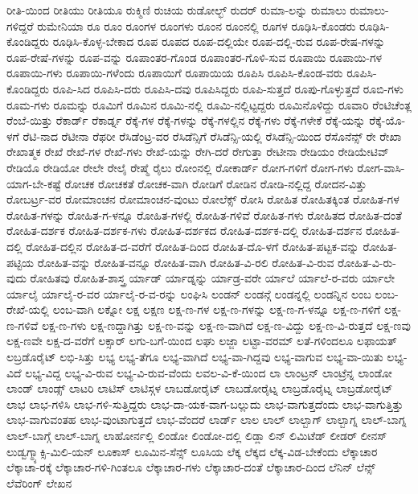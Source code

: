 {ರೀತಿ-ಯಿಂದ
ರೀತಿಯು
ರೀತಿಯೂ
ರುಕ್ಮಿಣಿ
ರುಚಿಯ
ರುಡೋಲ್ಭ್
ರುದರ್
ರುಮಾ-ಲನ್ನು
ರುಮಾಲು
ರುಮಾಲು-ಗಳಿದ್ದರೆ
ರುಮೇನಿಯಾ
ರೂ
ರೂಂ
ರೂಂಗಳ
ರೂಂಗಳು
ರೂಂನ
ರೂಂನಲ್ಲಿ
ರೂಗಳ
ರೂಢಿಸಿ-ಕೊಂಡರು
ರೂಢಿಸಿ-ಕೊಂಡಿದ್ದರು
ರೂಢಿಸಿ-ಕೊಳ್ಳ-ಬೇಕಾದ
ರೂಪ
ರೂಪದ
ರೂಪ-ದಲ್ಲಿಯೇ
ರೂಪ-ದಲ್ಲಿ-ರುವ
ರೂಪ-ರೇಷ-ಗಳನ್ನು
ರೂಪ-ರೇಷೆ-ಗಳನ್ನು
ರೂಪ-ವನ್ನು
ರೂಪಾಂತರ-ಗೊಂಡ
ರೂಪಾಂತರ-ಗೊಳಿ-ಸುವ
ರೂಪಾಯಿ
ರೂಪಾಯಿ-ಗಳ
ರೂಪಾಯಿ-ಗಳು
ರೂಪಾಯಿ-ಗಳೆಂದು
ರೂಪಾಯಿಗೆ
ರೂಪಾಯಿಯ
ರೂಪಿಸಿ
ರೂಪಿಸಿ-ಕೊಂಡ-ವರು
ರೂಪಿಸಿ-ಕೊಂಡಿದ್ದರು
ರೂಪಿ-ಸಿದ
ರೂಪಿಸಿ-ದರು
ರೂಪಿಸಿ-ದವು
ರೂಪಿಸಿದ್ದರು
ರೂಪಿ-ಸುತ್ತದೆ
ರೂಪು-ಗೊಳ್ಳುತ್ತದೆ
ರೂಬಿ-ಗಳು
ರೂಮ-ಗಳು
ರೂಮನ್ನು
ರೂಮಿಗೆ
ರೂಮಿನ
ರೂಮಿ-ನಲ್ಲಿ
ರೂಮಿ-ನಲ್ಲಿಟ್ಟದ್ದರು
ರೂಮಿನೊಳಿದ್ದು
ರೂವಾರಿ
ರೆಂಟಿಚೆಂತ್ಲ
ರೆಂಬೆ-ಯಿತ್ತು
ರೆಕಾರ್ಡ್
ರೆಕಾರ್ಡ್ನ
ರೆಕ್ಕೆ-ಗಳ
ರೆಕ್ಕೆ-ಗಳನ್ನು
ರೆಕ್ಕೆ-ಗಳಲ್ಲಿನ
ರೆಕ್ಕೆ-ಗಳು
ರೆಕ್ಕೆ-ಗಳೇಕೆ
ರೆಕ್ಕೆ-ಯನ್ನು
ರೆಕ್ಕೆ-ಯೊ-ಳಗೆ
ರೆಟಿ-ನಾದ
ರೆಟೀನಾ
ರೆಫರೀ
ರೆಸಿಡೆಂಟ್ರ-ವರ
ರೆಸಿಡೆನ್ಸಿಗೆ
ರೆಸಿಡೆನ್ಸಿ-ಯಲ್ಲಿ
ರೆಸಿಡೆನ್ಸಿ-ಯಿಂದ
ರೆಸೊನೆನ್ಸ್
ರೇ
ರೇಖಾ
ರೇಖಾತ್ಮಕ
ರೇಖೆ
ರೇಖೆ-ಗಳ
ರೇಖೆ-ಗಳು
ರೇಖೆ-ಯನ್ನು
ರೇಗಿ-ದರೆ
ರೇಗುತ್ತಾ
ರೇಟೀನಾ
ರೇಡಿಯಂ
ರೇಡಿಯೇಟಿವ್
ರೇಡಿಯೊ
ರೇಡಿಯೋ
ರೇಲೇ
ರೇಲೈ
ರೇಷ್ಮೆ
ರೈಲು
ರೋಂನಲ್ಲಿ
ರೋಕಾರ್ಡ್
ರೋಗ-ಗಳಿಗೆ
ರೋಗ-ಗಳು
ರೋಗ-ವಾಸಿ-ಯಾಗ-ಬೇ-ಕಷ್ಟೆ
ರೋಚಕ
ರೋಚಕತೆ
ರೋಚಕ-ವಾಗಿ
ರೋಡಿಗೆ
ರೋಡಿನ
ರೋಡಿ-ನಲ್ಲಿದ್ದ
ರೋದನ-ವಿತ್ತು
ರೋಬರ್ಟ್ರ-ವರ
ರೋಮಾಂಚನ
ರೋಮಾಂಚನ-ವುಂಟು
ರೋಲೆಕ್ಸ್
ರೋಸಿ
ರೋಹಿತ
ರೋಹಿತಕ್ಕಿಂತ
ರೋಹಿತ-ಗಳ
ರೋಹಿತ-ಗಳನ್ನು
ರೋಹಿತ-ಗ-ಳನ್ನೂ
ರೋಹಿತ-ಗಳಲ್ಲಿ
ರೋಹಿತ-ಗಳಿವೆ
ರೋಹಿತ-ಗಳು
ರೋಹಿತದ
ರೋಹಿತ-ದಂತೆ
ರೋಹಿತ-ದರ್ಶಕ
ರೋಹಿತ-ದರ್ಶಕ-ಗಳು
ರೋಹಿತ-ದರ್ಶಕದ
ರೋಹಿತ-ದರ್ಶಕ-ದಲ್ಲಿ
ರೋಹಿತ-ದರ್ಶನ
ರೋಹಿತ-ದಲ್ಲಿ
ರೋಹಿತ-ದಲ್ಲಿನ
ರೋಹಿತ-ದ-ವರೆಗೆ
ರೋಹಿತ-ದಿಂದ
ರೋಹಿತ-ದೊ-ಳಗೆ
ರೋಹಿತ-ಪಟ್ಟಕ-ವನ್ನು
ರೋಹಿತ-ಪಟ್ಟಿಯ
ರೋಹಿತ-ವನ್ನು
ರೋಹಿತ-ವನ್ನೂ
ರೋಹಿತ-ವಾಗಿ
ರೋಹಿತ-ವಿ-ರಲಿ
ರೋಹಿತ-ವಿ-ರುವ
ರೋಹಿತ-ವಿ-ರು-ವುದು
ರೋಹಿತವು
ರೋಹಿತ-ಶಾಸ್ತ್ರ
ರ್ಯಾಡ್
ರ್ಯಾಡ್ನನ್ನು
ರ್ಯಾಡ್ರ-ವರೇ
ರ್ಯಾಲೆ
ರ್ಯಾಲೆ-ರ-ವರು
ರ್ಯಾಲೇ
ರ್ಯಾಲೈ
ರ್ಯಾಲೈ-ರ-ವರ
ರ್ಯಾಲೈ-ರ-ವ-ರನ್ನು
ಲಂಘಿಸಿ
ಲಂಡನ್
ಲಂಡನ್ಗೆ
ಲಂಡನ್ನಲ್ಲಿ
ಲಂಡನ್ನಿನ
ಲಂಬ
ಲಂಬ-ರೇಖೆ-ಯಲ್ಲಿ
ಲಂಬ-ವಾಗಿ
ಲಕ್ನೋ
ಲಕ್ಷ
ಲಕ್ಷಣ
ಲಕ್ಷ-ಣ-ಗಳ
ಲಕ್ಷ-ಣ-ಗಳನ್ನು
ಲಕ್ಷ-ಣ-ಗ-ಳನ್ನೂ
ಲಕ್ಷ-ಣ-ಗಳಿಗೆ
ಲಕ್ಷ-ಣ-ಗಳಿವೆ
ಲಕ್ಷ-ಣ-ಗಳು
ಲಕ್ಷ-ಣದ್ದಾಗಿತ್ತು
ಲಕ್ಷ-ಣ-ವನ್ನು
ಲಕ್ಷ-ಣ-ವಾಗಿದೆ
ಲಕ್ಷ-ಣ-ವಿದ್ದು
ಲಕ್ಷ-ಣ-ವಿ-ರುತ್ತದೆ
ಲಕ್ಷ-ಣವು
ಲಕ್ಷ-ಣವೇ
ಲಕ್ಷ-ದ-ವರೆಗೆ
ಲಕ್ಸಾರ್
ಲಗು-ಬಗೆ-ಯಿಂದ
ಲಘು
ಲಜ್ಜಾ
ಲಟ್ಟಾ-ವರಮ್
ಲತೆ-ಗಳಿಂದಲೂ
ಲಫಾಯತ್
ಲಬ್ರಡೊರೈಟ್
ಲಭಿ-ಸಿತ್ತು
ಲಭ್ಯ
ಲಭ್ಯ-ತೆಗೂ
ಲಭ್ಯ-ವಾಗಿದೆ
ಲಭ್ಯ-ವಾ-ಗಿದ್ದವು
ಲಭ್ಯ-ವಾಗುವ
ಲಭ್ಯ-ವಾ-ಯಿತು
ಲಭ್ಯ-ವಿದೆ
ಲಭ್ಯ-ವಿದ್ದ
ಲಭ್ಯ-ವಿ-ರುವ
ಲಭ್ಯ-ವಿ-ರುವ-ವೆಂದು
ಲವಲ-ವಿ-ಕೆ-ಯಿಂದ
ಲಾ
ಲಾಂಟ್ರನ್
ಲಾಂಟ್ರೆನ್ನ
ಲಾಂಡೋ
ಲಾಂಡ್
ಲಾಂಡ್ಸ್
ಲಾಟರಿ
ಲಾಟಿಸ್
ಲಾಟಿಸ್ಗಳ
ಲಾಬಡೋರೈಟ್
ಲಾಬಡೋರೈಟ್ನ
ಲಾಬ್ರಡೊರೈಟ್ನ
ಲಾಬ್ರಡೋರೈಟ್
ಲಾಭ
ಲಾಭ-ಗಳಿಸಿ
ಲಾಭ-ಗಳಿ-ಸುತ್ತಿದ್ದರು
ಲಾಭ-ದಾ-ಯಕ-ವಾಗ-ಬಲ್ಲುದು
ಲಾಭ-ವಾಗುತ್ತದೆಂದು
ಲಾಭ-ವಾಗುತ್ತಿತ್ತು
ಲಾಭ-ವಾಗುವಂತಹ
ಲಾಭ-ವುಂಟಾಗುತ್ತದೆ
ಲಾಭ-ವೆಂದರೆ
ಲಾರ್ಡ್
ಲಾಲ
ಲಾಲ್
ಲಾಲ್ಬಾಗ್
ಲಾಲ್ಬಾಗ್ನ
ಲಾಲ್-ಬಾಗ್ನ
ಲಾಲ್-ಬಾಗ್ಗೆ
ಲಾಲ್-ಬಾಗ್ನ
ಲಾಹೋರ್ನಲ್ಲಿ
ಲಿಂಡೋ
ಲಿಂಡೋ-ದಲ್ಲಿ
ಲಿಡ್ಲಾ
ಲಿನ್
ಲಿಮಿಟೆಡ್
ಲೀಡರ್
ಲೀನಸ್
ಲುಡ್ವಗ್ಮ್ಯಾಕ್ಸಿ-ಮಿಲಿ-ಯನ್
ಲೂಕಾಸ್
ಲೂಮಿನ-ಸೆನ್ಸ್
ಲೂಸಿಯ
ಲೆಕ್ಕ
ಲೆಕ್ಕದ
ಲೆಕ್ಕ-ವಿಡ-ಬೇಕೆಂದು
ಲೆಕ್ಕಾಚಾರ
ಲೆಕ್ಕಾಚಾ-ರಕ್ಕೆ
ಲೆಕ್ಕಾಚಾರ-ಗಳಿ-ಗಿಂತಲೂ
ಲೆಕ್ಕಾಚಾರ-ಗಳು
ಲೆಕ್ಕಾಚಾರ-ದಂತೆ
ಲೆಕ್ಕಾಚಾರ-ದಿಂದ
ಲೆನಿನ್
ಲೆನ್ಸ್
ಲೆವೆರಿಂಗ್
ಲೇಖನ
}
